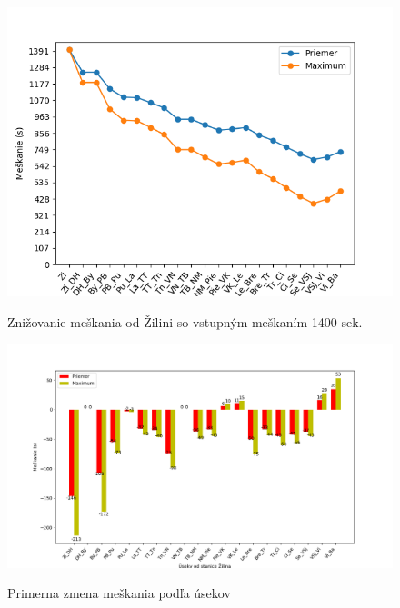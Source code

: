 \documentclass[11pt,a4paper]{article}
\begin{document}
\begin{figure}[H]
    \begin{center}
    \scalebox{0.8}
    {
        \includegraphics{Figure_4-2.png}
    }
    \caption{Znižovanie meškania od Žilini so vstupným meškaním 1400 sek.}
    \label{pic:GRAF6}
    \end{center}
\end{figure}

\begin{landscape}
    \begin{figure}[H]
        \begin{center}
        \scalebox{0.8}
        {
            \includegraphics{Figure_3.png}
        }
        \caption{Primerna zmena meškania podľa úsekov}
        \label{pic:GRAF3}
        \end{center}
    \end{figure}
\end{landscape}
\end{document}
